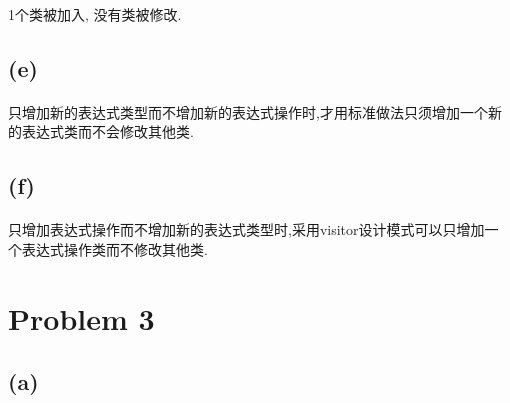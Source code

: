 \documentclass[A4paper,10pt]{paper}
\begin{document}
	\paragraph{} 1个类被加入, 没有类被修改.
	
	\subsection*{(e)}
	\paragraph{} 只增加新的表达式类型而不增加新的表达式操作时,才用标准做法只须增加一个新的表达式类而不会修改其他类.
	
	\subsection*{(f)}
	\paragraph{} 只增加表达式操作而不增加新的表达式类型时,采用visitor设计模式可以只增加一个表达式操作类而不修改其他类.
	
\section*{Problem 3}
	\subsection*{(a)}
\end{document}
